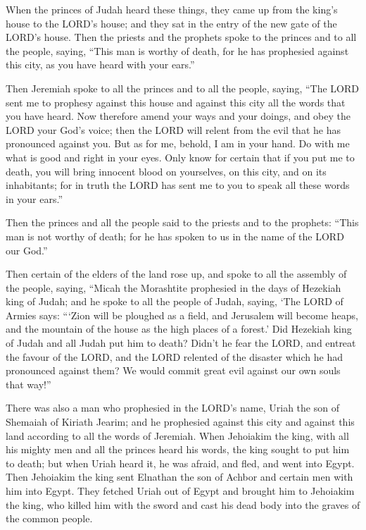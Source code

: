  When the princes of Judah heard these things, they came up
from the king's house to the LORD's house; and they sat in the entry of
the new gate of the LORD's house.  Then the priests and the
prophets spoke to the princes and to all the people, saying, ``This man
is worthy of death, for he has prophesied against this city, as you have
heard with your ears.''

 Then Jeremiah spoke to all the princes and to all the
people, saying, ``The LORD sent me to prophesy against this house and
against this city all the words that you have heard.  Now
therefore amend your ways and your doings, and obey the LORD your God's
voice; then the LORD will relent from the evil that he has pronounced
against you.  But as for me, behold, I am in your hand. Do
with me what is good and right in your eyes.  Only know for
certain that if you put me to death, you will bring innocent blood on
yourselves, on this city, and on its inhabitants; for in truth the LORD
has sent me to you to speak all these words in your ears.''

 Then the princes and all the people said to the priests
and to the prophets: ``This man is not worthy of death; for he has
spoken to us in the name of the LORD our God.''

 Then certain of the elders of the land rose up, and spoke
to all the assembly of the people, saying,  ``Micah the
Morashtite prophesied in the days of Hezekiah king of Judah; and he
spoke to all the people of Judah, saying, `The LORD of Armies says:
```Zion will be ploughed as a field, and Jerusalem will become heaps,
and the mountain of the house as the high places of a forest.'
 Did Hezekiah king of Judah and all Judah put him to death?
Didn't he fear the LORD, and entreat the favour of the LORD, and the
LORD relented of the disaster which he had pronounced against them? We
would commit great evil against our own souls that way!''

 There was also a man who prophesied in the LORD's name,
Uriah the son of Shemaiah of Kiriath Jearim; and he prophesied against
this city and against this land according to all the words of Jeremiah.
 When Jehoiakim the king, with all his mighty men and all
the princes heard his words, the king sought to put him to death; but
when Uriah heard it, he was afraid, and fled, and went into Egypt.
 Then Jehoiakim the king sent Elnathan the son of Achbor
and certain men with him into Egypt.  They fetched Uriah
out of Egypt and brought him to Jehoiakim the king, who killed him with
the sword and cast his dead body into the graves of the common people.

